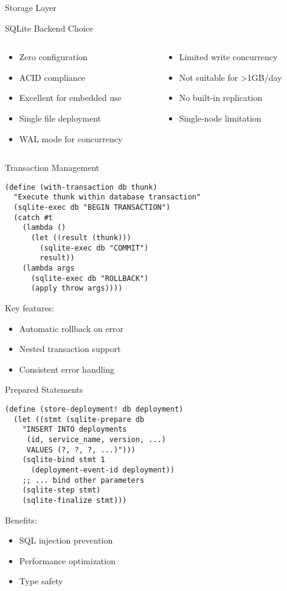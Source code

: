\documentclass[presentation,aspectratio=169]{beamer}
\begin{document}
\begin{frame}[label={sec:org9b31d87},fragile]{Storage Layer}
 \begin{block}{SQLite Backend Choice}
\begin{columns}
\begin{column}{0.5\columnwidth}
\begin{itemize}
\item Zero configuration
\item ACID compliance
\item Excellent for embedded use
\item Single file deployment
\item WAL mode for concurrency
\end{itemize}
\end{column}
\begin{column}{0.5\columnwidth}
\begin{itemize}
\item Limited write concurrency
\item Not suitable for >1GB/day
\item No built-in replication
\item Single-node limitation
\end{itemize}
\end{column}
\end{columns}
\end{block}
\begin{block}{Transaction Management}
\begin{verbatim}
(define (with-transaction db thunk)
  "Execute thunk within database transaction"
  (sqlite-exec db "BEGIN TRANSACTION")
  (catch #t
    (lambda ()
      (let ((result (thunk)))
        (sqlite-exec db "COMMIT")
        result))
    (lambda args
      (sqlite-exec db "ROLLBACK")
      (apply throw args))))
\end{verbatim}

Key features:
\begin{itemize}
\item Automatic rollback on error
\item Nested transaction support
\item Consistent error handling
\end{itemize}
\end{block}
\begin{block}{Prepared Statements}
\begin{verbatim}
(define (store-deployment! db deployment)
  (let ((stmt (sqlite-prepare db
    "INSERT INTO deployments
     (id, service_name, version, ...)
     VALUES (?, ?, ?, ...)")))
    (sqlite-bind stmt 1
      (deployment-event-id deployment))
    ;; ... bind other parameters
    (sqlite-step stmt)
    (sqlite-finalize stmt)))
\end{verbatim}

Benefits:
\begin{itemize}
\item SQL injection prevention
\item Performance optimization
\item Type safety
\end{itemize}
\end{block}
\end{frame}
\end{document}

